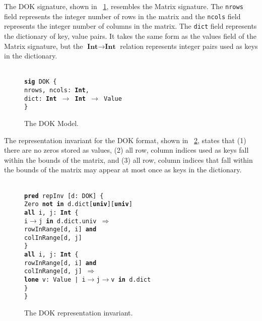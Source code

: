 \documentclass[11pt,conference]{IEEEtran}
\newenvironment{myquote}{\list{}{\leftmargin=12pt\rightmargin=0pt}\item[]}{\endlist}
\def\TA{\makebox[12pt]{}}
\def\TB{\makebox[24pt]{}}
\def\TC{\makebox[36pt]{}}
\def\Bsig{\textbf{sig} }
\def\Bpred{\textbf{pred} }
\def\Ball{\textbf{all} }
\def\Bin{\textbf{in} }
\def\Band{\textbf{and} }
\def\Bnot{\textbf{not} }
\def\Bimplies{$\Rightarrow$ }
\def\Bint{\textbf{Int}}
\def\Buniv{\textbf{univ}}
\def\Blone{\textbf{lone} }
\begin{document}
The DOK signature, shown in \figurename~\ref{model:dok}, resembles the Matrix signature.  The \texttt{nrows} field represents the integer number of rows in the matrix and the \texttt{ncols} field represents the integer number of columns in the matrix.  The \texttt{dict} field represents the dictionary of key, value pairs.  It takes the same form as the values field of the Matrix signature, but the \(\Bint \to \Bint\) relation represents integer pairs used as keys in the dictionary.

\begin{figure}
\centering
\begin{myquote}\small{\texttt{\\
\Bsig DOK \{\\
\TA nrows, ncols: \Bint,\\
\TA dict: \Bint~$\rightarrow$~\Bint~$\rightarrow$~Value\\
\}
}}
\end{myquote}
\caption{The DOK Model.}
\label{model:dok}
\end{figure}

The representation invariant for the DOK format, shown in \figurename~\ref{model:dokrep}, states that (1) there are no zeros stored as values, (2) all row, column indices used as keys fall within the bounds of the matrix, and (3) all row, column indices that fall within the bounds of the matrix may appear at most once as keys in the dictionary.

\begin{figure}
\centering
\begin{myquote}\small{\texttt{\\
\Bpred repInv [d: DOK] \{\\
\TA Zero \Bnot \Bin d.dict[\Buniv][\Buniv]\\
\TA \Ball i, j: \Bint~\{\\
\TB i$\rightarrow$j \Bin d.dict.univ \Bimplies\\
\TC rowInRange[d, i] \Band\\
\TC colInRange[d, j]\\
\TA \}\\
\TA \Ball i, j: \Bint~\{\\
\TB rowInRange[d, i] \Band\\
\TB colInRange[d, j] \Bimplies\\
\TC \Blone v: Value | i$\rightarrow$j$\rightarrow$v \Bin d.dict\\
\TA \}\\
\}\\
}}
\end{myquote}
\caption{The DOK representation invariant.}
\label{model:dokrep}
\end{figure}
\end{document}
